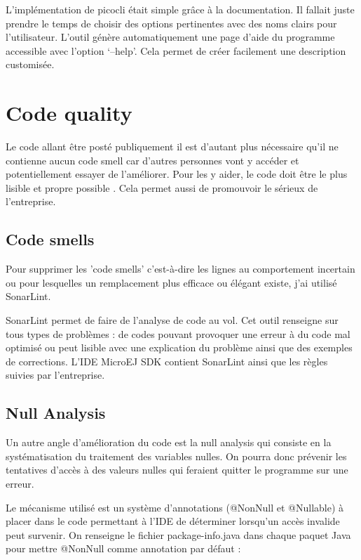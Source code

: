 \documentclass[french,a4paper,12pt]{report}
\begin{document}
L’implémentation de picocli était simple grâce à la documentation. Il fallait juste prendre le temps de choisir des options pertinentes avec des noms clairs pour l’utilisateur. L’outil génère automatiquement une page d’aide du programme accessible avec l’option ‘--help’. Cela permet de créer facilement une description customisée.

\section{Code quality}

Le code allant être posté publiquement il est d’autant plus nécessaire qu’il ne contienne aucun code smell car d’autres personnes vont y accéder et potentiellement essayer de l’améliorer. Pour les y aider, le code doit être le plus lisible et propre possible . Cela permet aussi de promouvoir le sérieux de l’entreprise. 

\subsection{Code smells}

Pour supprimer les 'code smells' c'est-à-dire les lignes au comportement incertain ou pour lesquelles un remplacement plus efficace ou élégant existe, j'ai utilisé SonarLint.

SonarLint permet de faire de l’analyse de code au vol. Cet outil renseigne sur tous types de problèmes : de codes pouvant provoquer une erreur à du code mal optimisé ou peut lisible avec une explication du problème ainsi que des exemples de corrections.
L'IDE MicroEJ SDK contient SonarLint ainsi que les règles suivies par l'entreprise.

\subsection{Null Analysis}

Un autre angle d'amélioration du code est la null analysis qui consiste en la systématisation du traitement des variables nulles. On pourra donc prévenir les tentatives d'accès à des valeurs nulles qui feraient quitter le programme sur une erreur. 

Le mécanisme utilisé est un système d'annotations (@NonNull et @Nullable) à placer dans le code permettant à l'IDE de déterminer lorsqu'un accès invalide peut survenir. On renseigne le fichier package-info.java dans chaque paquet Java pour mettre @NonNull comme annotation par défaut :
\end{document}
